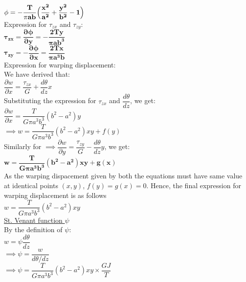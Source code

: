 \documentclass{article}
\begin{document}
$\mathbf{\phi=- \dfrac{T}{\pi ab} \Big{(}\dfrac{x^2}{a^2}+\dfrac{y^2}{b^2}-1\Big{)}}$\\

\noindent Expression for $\tau_{zx}$ and $\tau_{zy}$: \\

\noindent $\mathbf{\tau_{zx}=\dfrac{\partial\phi}{\partial y} =- \dfrac{2Ty}{\pi ab^3}}$\\

\noindent $\mathbf{\tau_{zy}=-\dfrac{\partial\phi}{\partial x} = \dfrac{2Tx}{\pi a^3b}}$\\

\noindent Expression for warping displacement: \\

\noindent We have derived that: \\
$\dfrac{\partial w}{\partial x}= \dfrac{\tau_{zx}}{G}+ \dfrac{d\theta}{dz}x$\\

\noindent Substituting the expression for $\tau_{zx}$ and $\dfrac{d\theta}{dz}$, we get:\\

\noindent $\dfrac{\partial w}{\partial x}=\dfrac{T}{G\pi a^3b^3}(b^2-a^2)y$\\
\noindent $\implies w=\dfrac{T}{G\pi a^3b^3}(b^2-a^2)xy+ f(y)$\\

\noindent Similarly for $\implies \dfrac{\partial w}{\partial y}= \dfrac{\tau_{zy}}{G}- \dfrac{d\theta}{dz}y$, we get:\\ 

\noindent $\mathbf{w=\dfrac{T}{G\pi a^3b^3}(b^2-a^2)xy+ g(x)}$ \\

\noindent As the warping dispacement given by both the equations must have same value at identical points $(x,y)$, $f(y)=g(x)=0$. Hence, the final expression for warping displacement is as follows \\

\noindent $w=\dfrac{T}{G\pi a^3b^3}(b^2-a^2)xy$\\

\noindent \underline{St. Venant function $\psi$}\\

\noindent By the definition of $\psi$:\\

\noindent $w=\psi \dfrac{d\theta}{dz}$\\
$\implies \psi=\dfrac{w}{d\theta/dz}$\\
$\implies \psi=\dfrac{T}{G\pi a^3b^3}(b^2-a^2)xy \times \dfrac{GJ}{T}$\\
\end{document}
